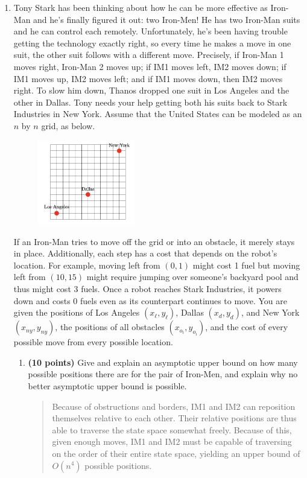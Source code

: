 \documentclass[11pt]{article}
\begin{document}
\begin{enumerate}
\item Tony Stark has been thinking about how he can be more effective as Iron-Man and he's finally figured it out: two Iron-Men! He has two Iron-Man suits and he can control each remotely. Unfortunately, he's been having trouble getting the technology exactly right, so every time he makes a move in one suit, the other suit follows with a different move. Precisely, if Iron-Man 1 moves right, Iron-Man 2 moves up; if IM1 moves left, IM2 moves down; if IM1 moves up, IM2 moves left; and if IM1 moves down, then IM2 moves right. To slow him down, Thanos dropped one suit in Los Angeles and the other in Dallas. Tony needs your help getting both his suits back to Stark Industries in New York.
Assume that the United States can be modeled as an $n$ by $n$ grid, as below.

\begin{figure}[H]
    \centering
    \includegraphics[width=0.4\textwidth]{tonystarkgrid.png}
    \label{fig:grid}
\end{figure}

If an Iron-Man tries to move off the grid or into an obstacle, it merely stays in place. Additionally, each step has a cost that depends on the robot's location. For example, moving left from $(0,1)$ might cost 1 fuel but moving left from $(10,15)$ might require jumping over someone's backyard pool and thus might cost 3 fuels. Once a robot reaches Stark Industries, it powers down and costs 0 fuels even as its counterpart continues to move. You are given the positions of Los Angeles $\left(x_{\ell}, y_{\ell}\right)$, Dallas $\left(x_d, y_d\right)$, and New York $\left(x_{n y}, y_{n y}\right)$, the positions of all obstacles $\left(x_{o_i}, y_{o_i}\right)$, and the cost of every possible move from every possible location.
    
\begin{enumerate}
    \item {\bf (10 points)} Give and explain an asymptotic upper bound on how many possible positions there are for the pair of Iron-Men, and explain why no better asymptotic upper bound is possible.
      \begin{quote}
        \color{purple}
        Because of obstructions and borders, IM1 and IM2 can reposition themselves relative to each other. Their relative positions are thus able to traverse the state space somewhat freely. Because of this, given enough moves, IM1 and IM2 must be capable of traversing on the order of their entire state space, yielding an upper bound of $O(n^4)$ possible positions.


\end{quote}
\end{enumerate}
\end{enumerate}
\end{document}
